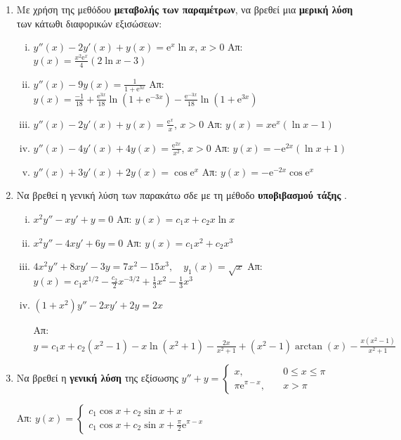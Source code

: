 \begin{enumerate}
  \item Με χρήση της μεθόδου \textbf{μεταβολής των παραμέτρων}, να βρεθεί 
    μια \textbf{μερική λύση} των κάτωθι διαφορικών εξισώσεων:
    \begin{enumerate}[i)]
      \item $y''(x)-2y'(x)+y(x)=\mathrm{e}^{x}\ln x$, $x>0$ 
        \hfill Απ: $y(x)=\frac{x^{2}\mathrm{e}^{x}}{4}(2\ln x-3)$
      \item $y''(x)-9y(x)=\frac{1}{1+\mathrm{e}^{3x}}$ 
        \hfill Απ: $y(x)=\frac{-1}{18}+\frac{\mathrm{e}^{3x}}{18}
        \ln (1+\mathrm{e}^{-3x})- \frac{\mathrm{e}^{-3x}}{18}\ln(1+\mathrm{e}^{3x})$
      \item $y''(x)-2y'(x)+y(x)=\frac{\mathrm{e}^x}{x}$, $x>0$ 
        \hfill Απ: $y(x)=x\mathrm{e}^{x}(\ln x-1)$
      \item $y''(x)-4y'(x)+4y(x)=\frac{\mathrm{e}^{2x}}{x^{2}}$, $x>0$ 
        \hfill Απ: $y(x)=-\mathrm{e}^{2x}(\ln x +1)$
      \item $y''(x)+3y'(x)+2y(x)=\cos \mathrm{e}^{x}$ 
        \hfill Απ: $y(x)=-\mathrm{e}^{-2x}\cos \mathrm{e}^{x}$
    \end{enumerate}

  \item Να βρεθεί η γενική λύση των παρακάτω σδε με τη μέθοδο 
    \textbf{υποβιβασμού τάξης} .
    \begin{enumerate}[i)]
      \item $ x^{2}y'' - xy' + y = 0 $ \hfill Απ: $ y(x)= c_{1}x + c_{2}x \ln{x} $ 
      \item $ x^{2}y'' - 4xy'+6y = 0 $ \hfill Απ: $ y(x)=c_{1}x^{2} + c_{2}x^{3} $ 
      \item $ 4x^{2}y'' + 8x y' -3y = 7x^{2}-15x^{3}, \quad y_{1}(x)= \sqrt{x} $ 
        \hfill Απ: $ y(x)= c_{1} x^{1/2} - \frac{c_{2}}{2} x^{-3/2} + 
        \frac{1}{3} x^{2} - \frac{1}{3} x^{3} $ 
      \item $ (1+x^{2})y''-2xy'+2y=2x $ 

        \hfill Απ: $ y= c_{1}x + c_{2}(x^{2}-1) - x \ln{(x^{2}+1)} - \frac{2x}{x^{2}+1}
        + (x^{2}-1) \arctan(x) - \frac{x(x^{2}-1)}{x^{2}+1} $
    \end{enumerate}

  \item Να βρεθεί η \textbf{γενική λύση} της εξίσωσης 
    $
      y''+y = 
      \begin{cases} 
        x, \quad &0 \leq x \leq \pi \\
        \pi \mathrm{e}^{\pi -x}, \quad &x > \pi
      \end{cases}
    $ 

    \hfill Απ: $ y(x) = 
    \begin{cases} 
      c_{1} \cos{x} + c_{2} \sin{x} + x \\
      c_{1} \cos{x} + c_{2} \sin{x} + \frac{\pi}{2} \mathrm{e}^{\pi -x} 
    \end{cases} $ 
\end{enumerate}







